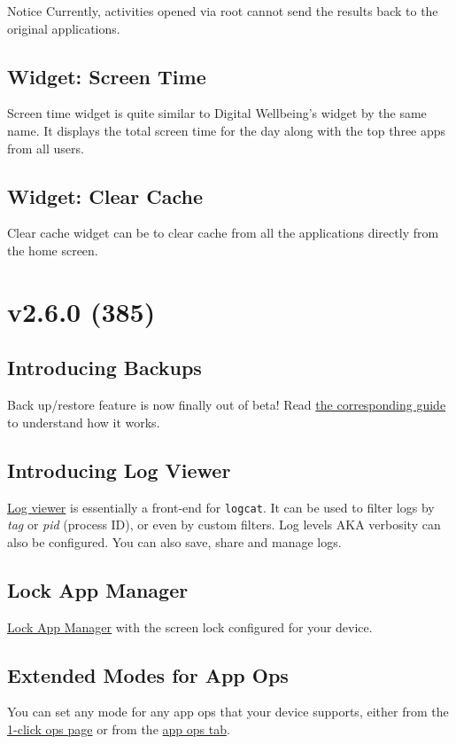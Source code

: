 \begin{tip}{Notice}
    Currently, activities opened via root cannot send the results back to the original applications.
\end{tip}

\subsection{Widget: Screen Time}
Screen time widget is quite similar to Digital Wellbeing's widget by the same name.
It displays the total screen time for the day along with the top three apps from all users.

\subsection{Widget: Clear Cache}
Clear cache widget can be to clear cache from all the applications directly from the home screen.


\section{v2.6.0 (385)}\label{sec:v2.6.0-(385)}

\subsection{Introducing Backups}
Back up/restore feature is now finally out of beta!
Read \hyperref[sec:backup-restore]{the corresponding guide} to understand how it works.

\subsection{Introducing Log Viewer}
\hyperref[subsubsec:log-viewer]{Log viewer} is essentially a front-end for \texttt{logcat}.
It can be used to filter logs by \textit{tag} or \textit{pid} (process ID), or even by custom filters.
Log levels AKA verbosity can also be configured.
You can also save, share and manage logs.

\subsection{Lock App Manager}
\hyperref[subsubsec:screen-lock]{Lock App Manager} with the screen lock configured for your device.

\subsection{Extended Modes for App Ops}
You can set any mode for any app ops that your device supports, either from the
\hyperref[subsec:set-mode-for-app-ops-dots]{1-click ops page} or from the \hyperref[subsubsec:app-ops]{app ops tab}.

